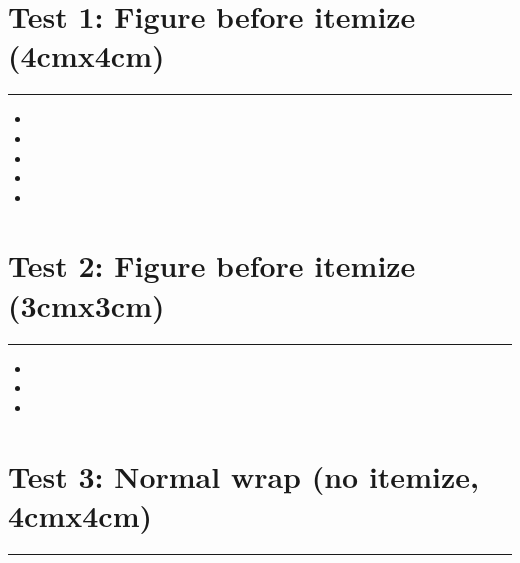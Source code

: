 \documentclass[11pt,a4paper]{article}
\begin{document}
\section{Test 1: Figure before itemize (4cmx4cm)}
\begin{swarmwrap}%
  \begin{minipage}[t]{4cm}
    \centering
    \textcolor{green!30}{\rule{\linewidth}{4cm}}
  \end{minipage}%
\end{swarmwrap}%
\swarmwrapnext
\begin{itemize}
  \item \lipsum[1][1-3]
  \item \lipsum[2][1-3]
  \item \lipsum[3][1-3]
  \item \lipsum[4][1-3]
  \item \lipsum[5][1-3]
\end{itemize}

\newpage
\section{Test 2: Figure before itemize (3cmx3cm)}
\begin{swarmwrap}%
  \begin{minipage}[t]{3cm}
    \centering
    \textcolor{green!30}{\rule{\linewidth}{3cm}}
  \end{minipage}%
\end{swarmwrap}%
\swarmwrapnext
\begin{itemize}
  \item \lipsum[1][1-3]
  \item \lipsum[2][1-3]
  \item \lipsum[3][1-3]
\end{itemize}

\newpage
\section{Test 3: Normal wrap (no itemize, 4cmx4cm)}
\begin{swarmwrap}%
  \begin{minipage}[t]{4cm}
    \centering
    \textcolor{green!30}{\rule{\linewidth}{4cm}}
  \end{minipage}%
\end{swarmwrap}%
\swarmwrapnext\lipsum[1]\lipsum[2]\lipsum[3]\lipsum[4]\lipsum[5]
\end{document}
